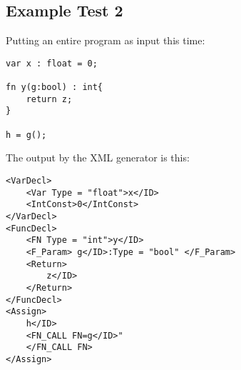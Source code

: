 \subsection{Example Test 2}
Putting an entire program as input this time:
\begin{lstlisting}
var x : float = 0;

fn y(g:bool) : int{
	return z;
}

h = g();
\end{lstlisting}

The output by the XML generator is this:
\begin{lstlisting}
<VarDecl>
	<Var Type = "float">x</ID>
	<IntConst>0</IntConst>
</VarDecl>
<FuncDecl>
	<FN Type = "int">y</ID>
	<F_Param> g</ID>:Type = "bool" </F_Param>
	<Return>
		z</ID>
	</Return>
</FuncDecl>
<Assign>
	h</ID>
	<FN_CALL FN=g</ID>"
	</FN_CALL FN>
</Assign>
\end{lstlisting}
